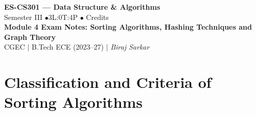 \documentclass[12pt,a4paper]{article}
\begin{document}
\begin{center}
  {\LARGE\bfseries\color{myred} ES-CS301 --- Data Structure \& Algorithms}\\[5pt]
  {\normalsize\color{mydark} Semester III \quad$\bullet$\quad 3L:0T:4P \quad$\bullet$ Credits}\\[3pt]
  {\normalsize\color{myteal}\textbf{Module 4 Exam Notes: Sorting Algorithms, Hashing Techniques and Graph Theory}}\\[3pt]
  {\small\color{mydark} CGEC \;$|$\; B.Tech ECE (2023--27) \;$|$\; \textit{Biraj Sarkar}}
\end{center}
\vspace{2pt}
\noindent{\color{myred}\rule{\linewidth}{1.5pt}}
\vspace{2pt}

\hypersetup{linkcolor=mydark}
\tableofcontents
\hypersetup{linkcolor=myteal}
\newpage

\section{Classification and Criteria of Sorting Algorithms}
\end{document}
